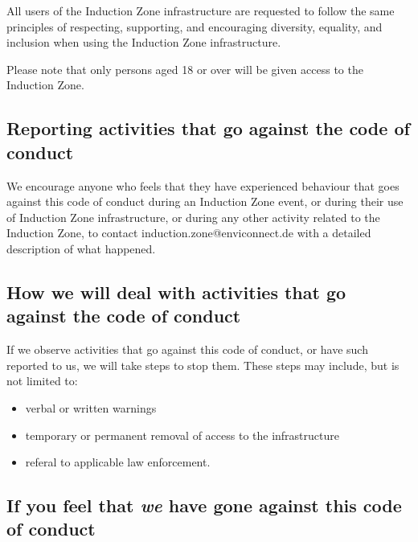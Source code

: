 \documentclass[
  10pt,
  a4paper,
]{article}
\providecommand{\tightlist}{%
  \setlength{\itemsep}{0pt}\setlength{\parskip}{0pt}}
\begin{document}
All users of the Induction Zone infrastructure are requested to follow
the same principles of respecting, supporting, and encouraging
diversity, equality, and inclusion when using the Induction Zone
infrastructure.

Please note that only persons aged 18 or over will be given access to
the Induction Zone.

\hypertarget{reporting-activities-that-go-against-the-code-of-conduct}{%
\subsection{Reporting activities that go against the code of
conduct}\label{reporting-activities-that-go-against-the-code-of-conduct}}

We encourage anyone who feels that they have experienced behaviour that
goes against this code of conduct during an Induction Zone event, or
during their use of Induction Zone infrastructure, or during any other
activity related to the Induction Zone, to contact
induction.zone@enviconnect.de with a detailed description of what
happened.

\hypertarget{how-we-will-deal-with-activities-that-go-against-the-code-of-conduct}{%
\subsection{How we will deal with activities that go against the code of
conduct}\label{how-we-will-deal-with-activities-that-go-against-the-code-of-conduct}}

If we observe activities that go against this code of conduct, or have
such reported to us, we will take steps to stop them. These steps may
include, but is not limited to:

\begin{itemize}
\tightlist
\item
  verbal or written warnings
\item
  temporary or permanent removal of access to the infrastructure
\item
  referal to applicable law enforcement.
\end{itemize}

\hypertarget{if-you-feel-that-we-have-gone-against-this-code-of-conduct}{%
\subsection{\texorpdfstring{If you feel that \emph{we} have gone against
this code of
conduct}{If you feel that we have gone against this code of conduct}}\label{if-you-feel-that-we-have-gone-against-this-code-of-conduct}}
\end{document}
